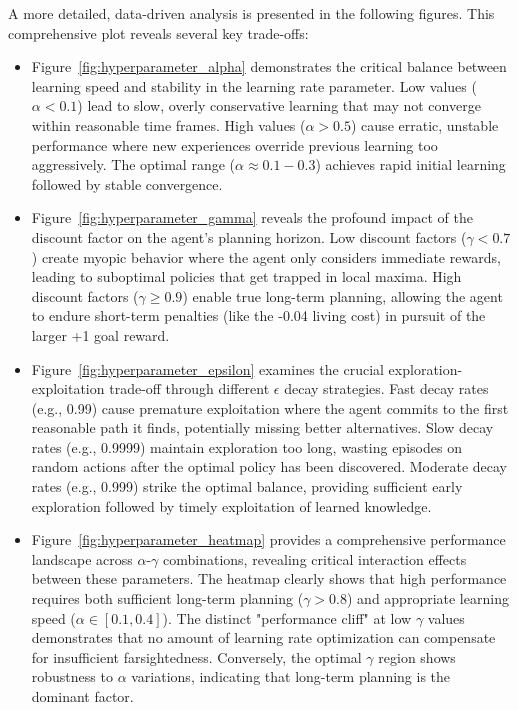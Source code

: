 \documentclass[11pt, a4paper]{article}
\begin{document}
A more detailed, data-driven analysis is presented in the following figures. This comprehensive plot reveals several key trade-offs:
\begin{itemize}
    \item Figure~\ref{fig:hyperparameter_alpha} demonstrates the critical balance between learning speed 
    and stability in the learning rate parameter. Low values ($\alpha < 0.1$) lead to slow, overly 
    conservative learning that may not converge within reasonable time frames. High values 
    ($\alpha > 0.5$) cause erratic, unstable performance where new experiences override 
    previous learning too aggressively. The optimal range ($\alpha \approx 0.1-0.3$) achieves 
    rapid initial learning followed by stable convergence.
    \item Figure~\ref{fig:hyperparameter_gamma} reveals the profound impact of the discount 
    factor on the agent's planning horizon. Low discount factors ($\gamma < 0.7$) create myopic 
    behavior where the agent only considers immediate rewards, leading to suboptimal policies 
    that get trapped in local maxima. High discount factors ($\gamma \geq 0.9$) enable true 
    long-term planning, allowing the agent to endure short-term penalties (like the -0.04 
    living cost) in pursuit of the larger +1 goal reward.
    \item Figure~\ref{fig:hyperparameter_epsilon} examines the crucial exploration-exploitation 
    trade-off through different $\epsilon$ decay strategies. Fast decay rates (e.g., 0.99) cause 
    premature exploitation where the agent commits to the first reasonable path it finds, 
    potentially missing better alternatives. Slow decay rates (e.g., 0.9999) maintain 
    exploration too long, wasting episodes on random actions after the optimal policy has 
    been discovered. Moderate decay rates (e.g., 0.999) strike the optimal balance, providing 
    sufficient early exploration followed by timely exploitation of learned knowledge.
    \item Figure~\ref{fig:hyperparameter_heatmap} provides a comprehensive performance landscape across $\alpha$-$\gamma$ combinations, revealing critical interaction effects between these parameters. The heatmap clearly shows that high performance requires both sufficient long-term planning ($\gamma > 0.8$) and appropriate learning speed ($\alpha \in [0.1, 0.4]$). The distinct "performance cliff" at low $\gamma$ values demonstrates that no amount of learning rate optimization can compensate for insufficient farsightedness. Conversely, the optimal $\gamma$ region shows robustness to $\alpha$ variations, indicating that long-term planning is the dominant factor.

\end{itemize}
\end{document}
